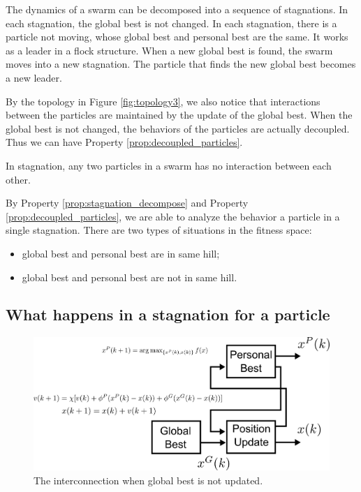 \begin{property}
\label{prop:stagnation_decompose}
The dynamics of a swarm can be decomposed into a sequence of stagnations.
In each stagnation, the global best is not changed.
In each stagnation, there is a particle not moving, whose global best and personal best are the same.
It works as a leader in a flock structure.
When a new global best is found, the swarm moves into a new stagnation.
The particle that finds the new global best becomes a new leader.
\end{property}

By the topology in Figure \ref{fig:topology3}, we also notice that interactions between the particles are maintained by the update of the global best.
When the global best is not changed, the behaviors of the particles are actually decoupled.
Thus we can have Property \ref{prop:decoupled_particles}.

\begin{property}
\label{prop:decoupled_particles}
In stagnation, any two particles in a swarm has no interaction between each other.
\end{property}

By Property \ref{prop:stagnation_decompose} and Property \ref{prop:decoupled_particles}, we are able to analyze the behavior a particle in a single stagnation.
There are two types of situations in the fitness space:
\begin{itemize}
\item global best and personal best are in same hill;
\item global best and personal best are not in same hill.
\end{itemize}

\subsection{What happens in a stagnation for a particle}

\begin{figure}
\centering
\includegraphics[width=0.8\linewidth]{./structure_constant_gb}
\caption{The interconnection when global best is not updated.}
\label{fig:structure_constant_gb}
\end{figure}

